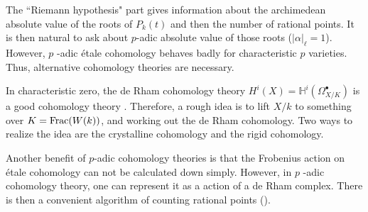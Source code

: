 The ``Riemann hypothesis" part gives information about 
the archimedean absolute value of the roots of $P_k(t)$ 
and then the number of rational points. 
It is then natural to ask about $p$-adic absolute value of those roots 
($|\alpha|_{\ell} = 1$). 
However, $p$ -adic \'etale cohomology behaves badly for characteristic $p$ varieties. 
Thus, alternative cohomology theories are necessary.

In characteristic zero, the de Rham cohomology theory 
$H^i(X) = \mathbb{H}^i(\Omega_{X/K}^\bullet)$ 
is a good cohomology theory \cite{Sta}. 
Therefore, a rough idea is to lift $X/k$ to something over $K = \operatorname{Frac}(W(k))$, 
and working out the de Rham cohomology. 
Two ways to realize the idea are the crystalline cohomology and the rigid cohomology.

Another benefit of $p$-adic cohomology theories is that 
the Frobenius action on \'etale cohomology can not be calculated down simply. 
However, in $p$ -adic cohomology theory, 
one can represent it as a action of a de Rham complex. 
There is then a convenient algorithm of counting rational points (\cite{Ke2}).

